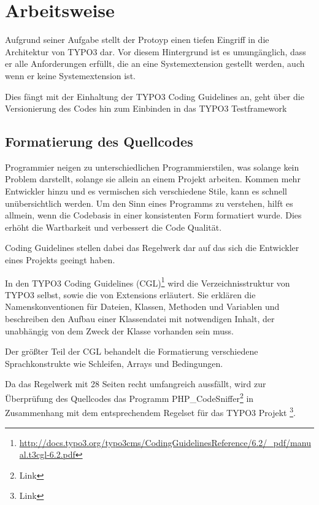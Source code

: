 \section{Arbeitsweise}
\label{sec:workstyle}
Aufgrund seiner Aufgabe stellt der Protoyp einen tiefen Eingriff in die Architektur von TYPO3 dar. Vor diesem Hintergrund ist es umungänglich, dass er alle Anforderungen erfüllt, die an eine Systemextension gestellt werden, auch wenn er keine Systemextension ist.

Dies fängt mit der Einhaltung der TYPO3 Coding Guidelines an, geht über die Versionierung des Codes hin zum Einbinden in das TYPO3 Testframework

\subsection{Formatierung des Quellcodes}
Programmier neigen zu unterschiedlichen Programmierstilen, was solange kein Problem darstellt, solange sie allein an einem Projekt arbeiten. Kommen mehr Entwickler hinzu und es vermischen sich verschiedene Stile, kann es schnell unübersichtlich werden. Um den Sinn eines Programms zu verstehen, hilft es allmein, wenn die Codebasis in einer konsistenten Form formatiert wurde. Dies erhöht die Wartbarkeit und verbessert die Code Qualität. 

Coding Guidelines stellen dabei das Regelwerk dar auf das sich die Entwickler eines Projekts geeingt haben. 

In den TYPO3 Coding Guidelines (CGL)\footnote{\url{http://docs.typo3.org/typo3cms/CodingGuidelinesReference/6.2/_pdf/manual.t3cgl-6.2.pdf}} wird die Verzeichnisstruktur von TYPO3 selbst, sowie die von Extensions erläutert. Sie erklären die Namenskonventionen für Dateien, Klassen, Methoden und Variablen und beschreiben den Aufbau einer Klassendatei mit notwendigen Inhalt, der unabhängig von dem Zweck der Klasse vorhanden sein muss.

Der größter Teil der CGL behandelt die Formatierung verschiedene Sprachkonstrukte wie Schleifen, Arrays und Bedingungen.

Da das Regelwerk mit 28 Seiten recht umfangreich aussfällt, wird zur Überprüfung des Quellcodes das Programm PHP\_CodeSniffer\footnote{Link} in Zusammenhang mit dem entsprechendem Regelset für das TYPO3 Projekt \footnote{Link}.

